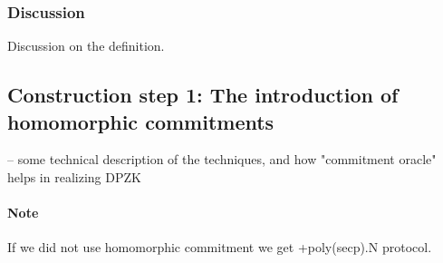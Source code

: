 \subsubsection{Discussion}
Discussion on the definition.

\subsection{Construction step 1: The introduction of homomorphic commitments}

 -- some technical description of the techniques, and how "commitment oracle"
helps in realizing DPZK

\paragraph{Note} If we did not use homomorphic commitment we get +poly(secp).N protocol.
